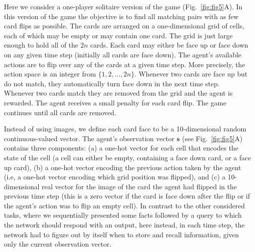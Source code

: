 \documentclass{article}
\newcommand{\vm}[1]{\bm{#1}}
\begin{document}
Here we consider a one-player solitaire version of the game (Fig.~\ref{fig:fig5}A). In this version of the game the objective is to find all matching pairs with as few card flips as possible. The cards are arranged on a one-dimensional grid of cells, each of which may be empty or may contain one card. The grid is just large enough to hold all of the $2n$ cards. Each card may either be face up or face down on any given time step (initially all cards are face down). The agent's available actions are to flip over any of the cards at a given time step. More precisely, the action space is an integer from $\{1, 2, \dots, 2n\}$. Whenever two cards are face up but do not match, they automatically turn face down in the next time step. Whenever two cards match they are removed from the grid and the agent is rewarded. The agent receives a small penalty for each card flip. The game continues until all cards are removed.

Instead of using images, we define each card face to be a \num{10}-dimensional random continuous-valued vector.
The agent's observation vector $\vm{s}$ (see Fig.~\ref{fig:fig5}A) contains three components: (a) a one-hot vector for each cell that encodes the state of the cell (a cell can either be empty, containing a face down card, or a face up card), (b) a one-hot vector encoding the previous action taken by the agent (i.e, a one-hot vector encoding which grid position was flipped), and (c) a 10-dimensional real vector for the image of the card the agent had flipped in the previous time step (this is a zero vector if the card is face down after the flip or if the agent's action was to flip an empty cell). 
In contrast to the other considered tasks, where we sequentially presented some facts followed by a query to which the network should respond with an output, here instead, in each time step, the network had to figure out by itself when to store and recall information, given only the current observation vector.
\end{document}
